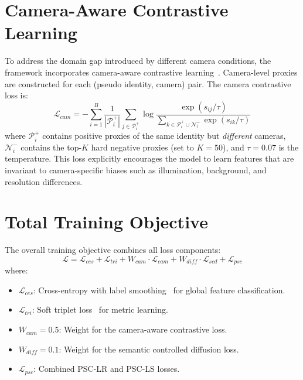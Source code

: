\section{Camera-Aware Contrastive Learning}

To address the domain gap introduced by different camera conditions, the framework incorporates camera-aware contrastive learning~\cite{wang2021cap}. Camera-level proxies are constructed for each (pseudo identity, camera) pair. The camera contrastive loss is:
\begin{equation}
    \mathcal{L}_{cam} = -\sum_{i=1}^{B} \frac{1}{|\mathcal{P}_i^+|} \sum_{j \in \mathcal{P}_i^+} \log \frac{\exp(s_{ij}/\tau)}{\sum_{k \in \mathcal{P}_i^+ \cup \mathcal{N}_i^-} \exp(s_{ik}/\tau)}
\end{equation}
where $\mathcal{P}_i^+$ contains positive proxies of the same identity but \textit{different} cameras, $\mathcal{N}_i^-$ contains the top-$K$ hard negative proxies (set to $K=50$), and $\tau = 0.07$ is the temperature. This loss explicitly encourages the model to learn features that are invariant to camera-specific biases such as illumination, background, and resolution differences.

\section{Total Training Objective}

The overall training objective combines all loss components:
\begin{equation}
    \mathcal{L} = \mathcal{L}_{ces} + \mathcal{L}_{tri} + W_{cam} \cdot \mathcal{L}_{cam} + W_{diff} \cdot \mathcal{L}_{scd} + \mathcal{L}_{psc}
\end{equation}
where:
\begin{itemize}
    \item $\mathcal{L}_{ces}$: Cross-entropy with label smoothing~\cite{szegedy2016rethinking} for global feature classification.
    \item $\mathcal{L}_{tri}$: Soft triplet loss~\cite{hermans2017triplet} for metric learning.
    \item $W_{cam} = 0.5$: Weight for the camera-aware contrastive loss.
    \item $W_{diff} = 0.1$: Weight for the semantic controlled diffusion loss.
    \item $\mathcal{L}_{psc}$: Combined PSC-LR and PSC-LS losses.
\end{itemize}
